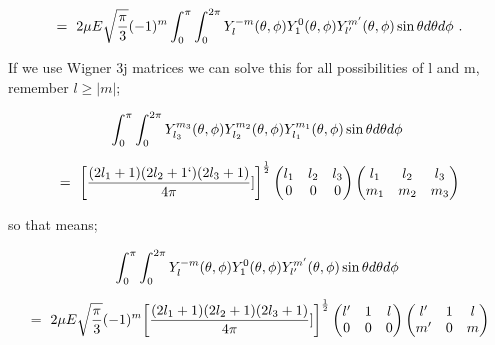 \documentclass{article}
\begin{document}
\begin{equation} \label{eb-eq-265-1}
= \hspace{0.125cm} 2 \mu E \sqrt{\frac{\pi}{3}} (-1)^{m} \int_{0}^{\pi} \int_{0}^{2\pi} Y_{l}^{-m}(\theta, \phi) Y_{1}^{0}(\theta, \phi) Y_{l'}^{m'}(\theta, \phi) \sin\theta d\theta d\phi \hspace{0.125cm} . 
\end{equation}

If we use Wigner 3j matrices we can solve this for all possibilities of l and m, remember \begin{math} l \ge \big| m \big| \end{math};

\begin{equation} \label{eb-eq-262-2}
\int_{0}^{\pi} \int_{0}^{2\pi} Y_{l_{3}}^{m_{3}}(\theta, \phi) Y_{l_{2}}^{m_{2}}(\theta, \phi) Y_{l_{1}}^{m_{1}}(\theta, \phi) \sin\theta d\theta d\phi \hspace{0.125cm} 
\end{equation}

\begin{equation} \label{eb-eq-263-2}
= \hspace{0.125cm} \bigg[\frac{(2 l_1 + 1)(2 l_2 + 1`)(2 l_3 + 1)}{4\pi}]\bigg]^{\frac{1}{2}}\begin{pmatrix} l_1 & l_2 & l_3 \\ 0 & 0 & 0 \end{pmatrix}\begin{pmatrix} l_1 & l_2 & l_3 \\ m_1 & m_2 & m_3 \end{pmatrix}
\end{equation}

so that means;

\begin{equation} \label{eb-eq-264-2}
\int_{0}^{\pi} \int_{0}^{2\pi} Y_{l}^{-m}(\theta, \phi) Y_{1}^{0}(\theta, \phi) Y_{l'}^{m'}(\theta, \phi) \sin\theta d\theta d\phi \hspace{0.125cm} 
\end{equation}

\begin{equation} \label{eb-eq-265-2}
= \hspace{0.125cm} 2 \mu E \sqrt{\frac{\pi}{3}} (-1)^{m} \bigg[\frac{(2 l_1 + 1)(2 l_2 + 1)(2 l_3 + 1)}{4\pi}]\bigg]^{\frac{1}{2}}\begin{pmatrix} l' & 1 & l \\ 0 & 0 & 0 \end{pmatrix}\begin{pmatrix} l' & 1 & l \\ m' & 0 & m \end{pmatrix}
\end{equation}
\end{document}
